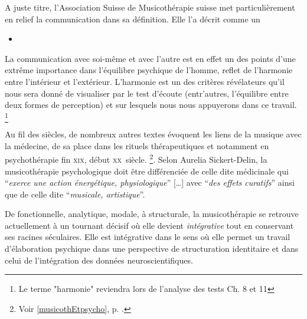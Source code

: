 A juste titre, l'Association Suisse de Musicothérapie suisse met particulièrement en relief 
la communication dans sa définition. Elle l'a décrit comme un 
 
\begin{itemize}
\item {}
\end{itemize}

La communication avec soi-même et avec l'autre est en effet un des
points 
d'une extrême importance dans l'équilibre psychique de l'homme, reflet
de 
l'harmonie entre l'intérieur et l'extérieur. L'harmonie est un des  
critères révélateurs qu'il nous sera donné de visualiser par le test
d'écoute (entr'autres, l'équilibre entre deux formes de perception) et sur
lesquels 
nous nous appuyerons  
dans ce travail.  \footnote{Le terme "harmonie" reviendra lors de
  l'analyse des tests Ch. 8 et 11}


 Au fil des siècles, de nombreux autres 
textes évoquent les liens de la musique avec la médecine, de sa place dans les 
rituels thérapeutiques et notamment en psychothérapie fin \textsc{xix}\ieme, 
début \textsc{xx}\ieme\ siècle. \footnote{Voir \ref{musicothEtpsycho},
  p. \pageref{musicothEtpsycho}.}.
Selon Aurelia Sickert-Delin, la musicothérapie 
psychologique doit être différenciée de celle dite médicinale qui 
\enquote{\emph{exerce une action 
énergétique, physiologique}} [\dots] avec \enquote{\emph{des effets curatifs}}  
ainsi que de celle dite \enquote{\emph{musicale, artistique}}. 

 De fonctionnelle, analytique, mo\-da\-le,  à 
struc\-tu\-rale, la musicothérapie se retrouve actuellement 
 à un tournant décisif où elle devient 
 \emph{intégrative} tout en conservant ses racines séculaires. Elle est 
intégrative dans le sens où elle permet un travail d'élaboration psychique dans une perspective de structuration identitaire \autocite[ch. III, p. 53, 
105]{vrait_musicotherapie_2018} et dans celui de l'intégration des données 
neuroscientifiques.
 
